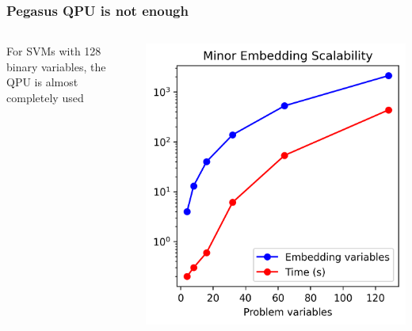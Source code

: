 \documentclass[aspectratio=169]{beamer}
\begin{document}
\begin{frame}
{\begin{columns}
\begin{column}{0.4\textwidth}
            \end{column}
        \end{columns}
    }

\end{frame}

\begin{frame}
    \frametitle{Pegasus QPU is not enough}

    \begin{columns}
        \begin{column}{0.5\textwidth}
            For SVMs with 128 binary variables, the QPU is almost completely used
        \end{column}
        \begin{column}{0.5\textwidth}
            \centering
            \includegraphics[height=0.8\textheight]{img/embedding_search_time.png}
        \end{column}
    \end{columns}

\end{frame}
\end{document}
